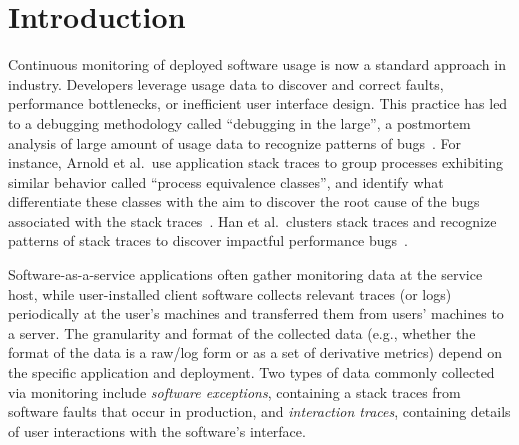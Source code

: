 \section{Introduction}


%
%

Continuous monitoring of deployed software usage is now a standard approach in
industry. Developers leverage usage data to discover and correct faults,
performance bottlenecks, or inefficient user interface design.  This practice
has led to a debugging methodology called ``debugging in the large'', a
postmortem analysis of large amount of usage data to recognize patterns of
bugs~\cite{Han:2012:PDL:2337223.2337241, glerum2009debugging}. For instance,
Arnold et al.\ use application stack traces to group processes exhibiting
similar behavior called ``process equivalence classes'', and identify what
differentiate these classes with the aim to discover the root cause of the bugs
associated with the stack traces~\cite{arnold2007stack}. Han et al.\ clusters
stack traces and recognize patterns of stack traces to discover impactful
performance bugs~\cite{Han:2012:PDL:2337223.2337241}.

Software-as-a-service applications often gather monitoring data at the service
host, while user-installed client software collects relevant traces (or logs)
periodically at the user's machines and transferred them from users'
machines to a server. The granularity and format of the collected data (e.g.,
whether the format of the data is a raw/log form or as a set of derivative
metrics) depend on the specific application and deployment. Two types of data
commonly collected via monitoring include {\em software exceptions}, containing
a stack traces from software faults that occur in production, and {\em
interaction traces}, containing details of user interactions with the
software's interface.


